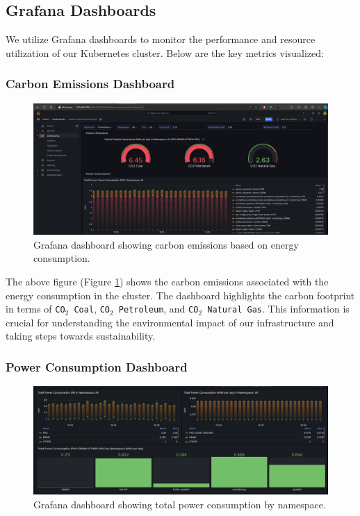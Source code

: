 \subsection{Grafana Dashboards}
We utilize Grafana dashboards to monitor the performance and resource utilization of our Kubernetes cluster. Below are the key metrics visualized:
\subsubsection{Carbon Emissions Dashboard}
\begin{figure}[H]
    \centering
    \includegraphics[width=\textwidth]{Figures/grafana-dashboard-1.png}
    \caption{Grafana dashboard showing carbon emissions based on energy consumption.}
    \label{fig:grafana-dashboard-2}
\end{figure}

The above figure (Figure \ref{fig:grafana-dashboard-2}) shows the carbon emissions associated with the energy consumption in the cluster. The dashboard highlights the carbon footprint in terms of \texttt{CO$_2$ Coal}, \texttt{CO$_2$ Petroleum}, and \texttt{CO$_2$ Natural Gas}. This information is crucial for understanding the environmental impact of our infrastructure and taking steps towards sustainability.


\subsubsection{Power Consumption Dashboard}
\begin{figure}[H]
    \centering
    \includegraphics[width=\textwidth]{Figures/grafana-dashboard-2.png}
    \caption{Grafana dashboard showing total power consumption by namespace.}
    \label{fig:grafana-dashboard-1}
\end{figure}

